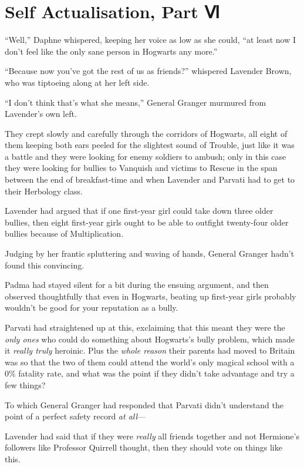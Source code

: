 \chapter{Self Actualisation, Part Ⅵ}

``Well,'' Daphne whispered, keeping her voice as low as she could, ``at
least now I don't feel like the only sane person in Hogwarts any more.''

``Because now you've got the rest of us as friends?'' whispered Lavender
Brown, who was tiptoeing along at her left side.

``I don't think that's what she means,'' General Granger murmured from
Lavender's own left.

They crept slowly and carefully through the corridors of Hogwarts, all
eight of them keeping both ears peeled for the slightest sound of
Trouble, just like it was a battle and they were looking for enemy
soldiers to ambush; only in this case they were looking for bullies to
Vanquish and victims to Rescue in the span between the end of
breakfast-time and when Lavender and Parvati had to get to their
Herbology class.

Lavender had argued that if one first-year girl could take down three
older bullies, then eight first-year girls ought to be able to outfight
twenty-four older bullies because of Multiplication.

Judging by her frantic spluttering and waving of hands, General Granger
hadn't found this convincing.

Padma had stayed silent for a bit during the ensuing argument, and then
observed thoughtfully that even in Hogwarts, beating up first-year girls
probably wouldn't be good for your reputation as a bully.

Parvati had straightened up at this, exclaiming that this meant they
were the \emph{only ones} who could do something about Hogwarts's bully
problem, which made it \emph{really truly} heroinic. Plus the
\emph{whole reason} their parents had moved to Britain was so that the
two of them could attend the world's only magical school with a 0\%
fatality rate, and what was the point if they didn't take advantage and
try a few things?

To which General Granger had responded that Parvati didn't understand
the point of a perfect safety record \emph{at all}---

Lavender had said that if they were \emph{really} all friends together
and not Hermione's followers like Professor Quirrell thought, then they
should vote on things like this.


